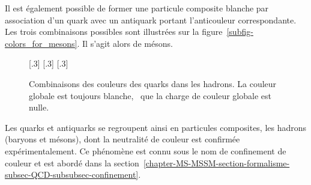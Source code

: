 Il est également possible de former une particule composite blanche par association d'un quark avec un antiquark portant l'anticouleur correspondante. Les trois combinaisons possibles sont illustrées sur la figure~\ref{subfig-colors_for_mesons}. Il s'agit alors de mésons.
\begin{figure}[h]
\centering
{}[.3\textwidth]
{}
\hfill
{}[.3\textwidth]
{}
\hfill
{}[.3\textwidth]
{}
\caption[Combinaisons des couleurs des quarks dans les hadrons.]{Combinaisons des couleurs des quarks dans les hadrons. La couleur globale est toujours blanche, \ie\ que la charge de couleur globale est nulle.}
\label{fig-colors_for_hadrons}
\end{figure}
\par Les quarks et antiquarks se regroupent ainsi en particules composites, les hadrons (baryons et mésons), dont la neutralité de couleur est confirmée expérimentalement. Ce phénomène est connu sous le nom de \og confinement de couleur \fg{} et est abordé dans la section~\ref{chapter-MS-MSSM-section-formalisme-subsec-QCD-subsubsec-confinement}.
